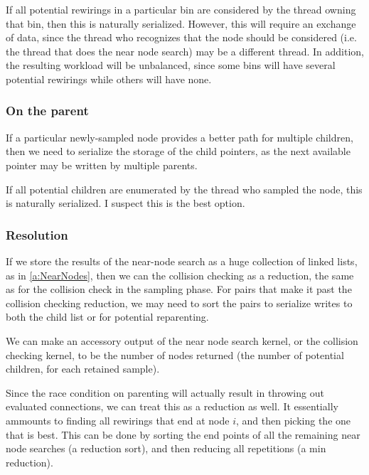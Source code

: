 If all potential rewirings in a particular bin are considered by the thread owning that bin, then this is naturally serialized. However, this will require an exchange of data, since the thread who recognizes that the node should be considered (i.e. the thread that does the near node search) may be a different thread. In addition, the resulting workload will be unbalanced, since some bins will have several potential rewirings while others will have none.


\subsubsection{On the parent}
If a particular newly-sampled node provides a better path for multiple children, then we need to serialize the storage of the child pointers, as the next available pointer may be written by multiple parents. 

If all potential children are enumerated by the thread who sampled the node, this is naturally serialized. I suspect this is the best option. 

\subsubsection{Resolution}
If we store the results of the near-node search as a huge collection of linked lists, as in \ref{a:NearNodes}, then we can the collision checking as a reduction, the same as for the collision check in the sampling phase. For pairs that make it past the collision checking reduction, we may need to sort the pairs to serialize writes to both the child list or for potential reparenting. 

We can make an accessory output of the near node search kernel, or the collision checking kernel, to be the number of nodes returned (the number of potential children, for each retained sample). 

Since the race condition on parenting will actually result in throwing out evaluated connections, we can treat this as a reduction as well. It essentially ammounts to finding all rewirings that end at node $i$, and then picking the one that is best. This can be done by sorting the end points of all the remaining near node searches (a reduction sort), and then reducing all repetitions (a min reduction). 
 
\begin{figure}[H]
\begin{centering}
    \texttt{[image: \\figfile\{fig/kernel\_near\_rotate]}}
    \caption{Near Reduction}
\end{centering} 
\end{figure}

